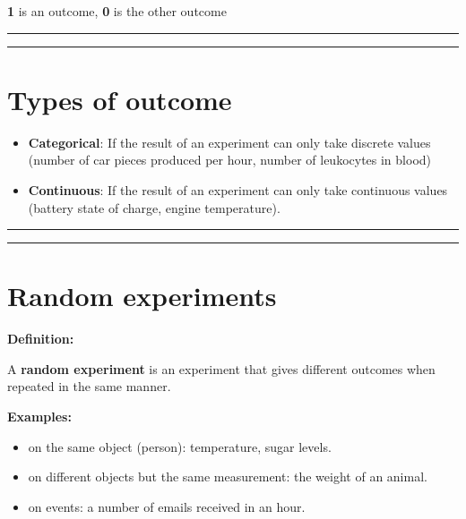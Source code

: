 \documentclass[
]{book}
\providecommand{\tightlist}{%
  \setlength{\itemsep}{0pt}\setlength{\parskip}{0pt}}
\begin{document}
\textbf{1} is an outcome, \textbf{0} is the other outcome

\begin{center}\rule{0.5\linewidth}{0.5pt}\end{center}

\begin{center}\rule{0.5\linewidth}{0.5pt}\end{center}

\hypertarget{types-of-outcome}{%
\section{Types of outcome}\label{types-of-outcome}}

\begin{itemize}
\tightlist
\item
  \textbf{Categorical}: If the result of an experiment can only take discrete values (number of car pieces produced per hour, number of leukocytes in blood)
\end{itemize}

\begin{itemize}
\tightlist
\item
  \textbf{Continuous}: If the result of an experiment can only take continuous values (battery state of charge, engine temperature).
\end{itemize}

\begin{center}\rule{0.5\linewidth}{0.5pt}\end{center}

\begin{center}\rule{0.5\linewidth}{0.5pt}\end{center}

\hypertarget{random-experiments}{%
\section{Random experiments}\label{random-experiments}}

\textbf{Definition:}

A \textbf{random experiment} is an experiment that gives different outcomes when repeated in the same manner.

\textbf{Examples:}

\begin{itemize}
\tightlist
\item
  on the same object (person): temperature, sugar levels.\\
\item
  on different objects but the same measurement: the weight of an animal.
\item
  on events: a number of emails received in an hour.
\end{itemize}
\end{document}

